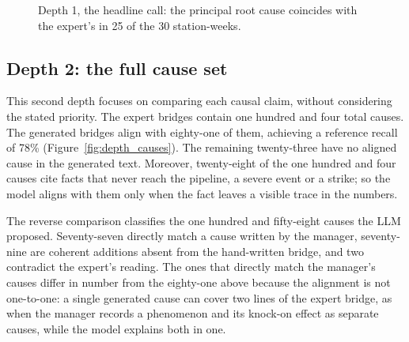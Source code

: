 \documentclass[12pt,a4paper,openright,twoside]{book}
\begin{document}
\begin{figure}[ht]
  \centering
  \caption{Depth 1, the headline call: the principal root cause coincides with the expert's in 25 of the 30 station-weeks.}
  \label{fig:depth_headline}
\end{figure}
\FloatBarrier


\subsection{Depth 2: the full cause set}
\label{sec:depth_cause}

This second depth focuses on comparing each causal claim, without considering the stated priority.
The expert bridges contain one hundred and four total causes. 
The generated bridges align with eighty-one of them, achieving a reference recall of 78\% (Figure~\ref{fig:depth_causes}).
The remaining twenty-three have no aligned cause in the generated text.
Moreover, twenty-eight of the one hundred and four causes cite facts that never reach the pipeline, a severe event or a strike; so the model aligns with them only when the fact leaves a visible trace in the numbers.

The reverse comparison classifies the one hundred and fifty-eight causes the \ac{LLM} proposed. 
Seventy-seven directly match a cause written by the manager, seventy-nine are coherent additions absent from the hand-written bridge, and two contradict the expert's reading.
The ones that directly match the manager's causes differ in number from the eighty-one above because the alignment is not one-to-one: a single generated cause can cover two lines of the expert bridge, as when the manager records a phenomenon and its knock-on effect as separate causes, while the model explains both in one.
\end{document}
